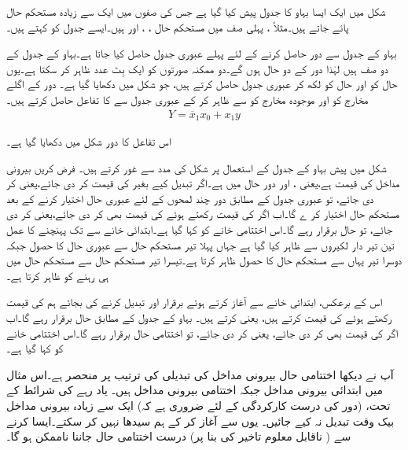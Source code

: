 شکل میں ایک ایسا بہاو کا جدول  پیش کیا  گیا ہے جس کی صفوں میں ایک سے زیادہ مستحکم حال پائے جاتے ہیں۔مثلاً ، پہلی صف میں  مستحکم حال  ، ، اور   ہیں۔ایسے جدول کو  کہتے ہیں۔

 بہاو کے جدول سے دور حاصل کرنے کے لئے پہلے عبوری جدول حاصل کیا جاتا ہے۔بہاو کے جدول کے دو صف  ہیں  لہٰذا دور کے دو  حال  ہوں گے۔دو ممکنہ صورتوں کو ایک بِٹ  عدد ظاہر  کر سکتا ہے۔یوں حال  کو   اور حال   کو   لکھ  کر عبوری جدول حاصل کرتے ہیں، جو شکل میں  دکھایا گیا ہے۔ دور کے اگلے   مخارج  کو    اور موجودہ مخارج کو  سے ظاہر کر کے عبوری جدول سے    کا تفاعل حاصل کرتے ہیں۔
\begin{align}
Y=\overline{x}_1x_0+x_1y
\end{align}

اس تفاعل کا دور شکل میں دکھایا گیا ہے۔

 شکل  میں پیش  بہاو کے جدول کے استعمال پر شکل  کی مدد سے غور کرتے ہیں۔ فرض  کریں بیرونی مداخل   کی قیمت   ہے،یعنی  ،   اور دور حال   میں ہے۔اگر  تبدیل کیے بغیر  کی قیمت  کر دی جائے،یعنی  کر دی جائے، تو عبوری جدول کے مطابق دور  چند لمحوں کے لئے   عبوری   حال   اختیار کرنے کے بعد  مستحکم حال  اختیار کر ے گا۔اب اگر  کی قیمت  رکھتے ہوئے  کی قیمت بھی   کر دی جائے،یعنی   کر دی جائے، تو  حال   برقرار رہے گا۔اس اختتامی خانے کو کہا گیا ہے۔ابتدائی خانے سے تک پہنچنے کا عمل تین تیر دار لکیروں سے ظاہر کیا گیا ہے جہاں پہلا تیر  مستحکم حال  سے عبوری حال   کا حصول جبکہ دوسرا تیر یہاں سے مستحکم حال   کا حصول   ظاہر کرتا ہے۔تیسرا تیر مستحکم حال   سے مستحکم حال   میں ہی رہنے کو ظاہر کرتا ہے۔

اس کے برعکس، ابتدائی خانے سے آغاز کرتے ہوئے   برقرار اور    تبدیل کرنے کی بجائے ہم   کی قیمت  رکھتے ہوئے  کی قیمت  کرتے ہیں، یعنی   کرتے ہیں۔ بہاو کے جدول کے مطابق حال   برقرار رہے گا۔اب اگر  کی قیمت بھی   کر دی جائے، یعنی  کر دی جائے، تو اختتامی حال  برقرار     رہے گا۔اس اختتامی خانے کو   کہا گیا ہے۔

آپ نے دیکھا  اختتامی حال بیرونی مداخل کی تبدیلی کی ترتیب پر منحصر ہے۔اس مثال میں ابتدائی بیرونی مداخل   جبکہ اختتامی بیرونی مداخل   ہیں۔ یاد رہے  کی شرائط کے تحت،     (دور کی درست   کارکردگی   کے لئے ضروری ہے کہ)  ایک سے زیادہ بیرونی مداخل بیک وقت تبدیل نہ کیے جائیں۔ یوں   سے آغاز کر کے  ہم سیدھا  نہیں   کر سکتے۔ایسا کرنے سے ( ناقابل معلوم تاخیر کی بنا پر)  درست  اختتامی حال  جاننا ناممکن ہو گا۔


